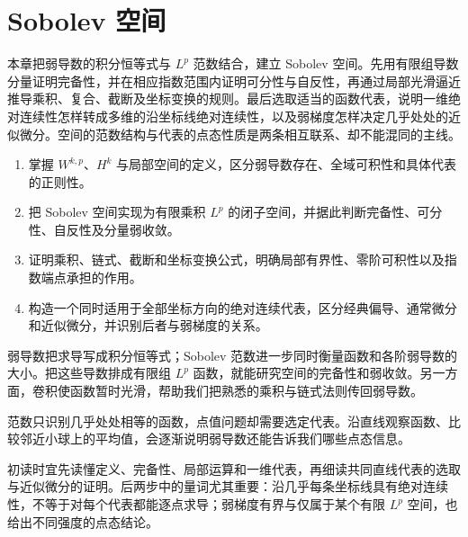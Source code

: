 \chapter{Sobolev 空间}
\label{b1:ch:21}
\begin{chapterabstract}
本章把弱导数的积分恒等式与 \(L^p\) 范数结合，建立 Sobolev 空间。先用有限组导数分量证明完备性，并在相应指数范围内证明可分性与自反性，再通过局部光滑逼近推导乘积、复合、截断及坐标变换的规则。最后选取适当的函数代表，说明一维绝对连续性怎样转成多维的沿坐标线绝对连续性，以及弱梯度怎样决定几乎处处的近似微分。空间的范数结构与代表的点态性质是两条相互联系、却不能混同的主线。
\end{chapterabstract}

\begin{learninggoals}
\begin{enumerate}
\item\label{b1:goal:21-definition}掌握 \(W^{k,p}\)、\(H^k\) 与局部空间的定义，区分弱导数存在、全域可积性和具体代表的正则性。
\item\label{b1:goal:21-structure}把 Sobolev 空间实现为有限乘积 \(L^p\) 的闭子空间，并据此判断完备性、可分性、自反性及分量弱收敛。
\item\label{b1:goal:21-calculus}证明乘积、链式、截断和坐标变换公式，明确局部有界性、零阶可积性以及指数端点承担的作用。
\item\label{b1:goal:21-representatives}构造一个同时适用于全部坐标方向的绝对连续代表，区分经典偏导、通常微分和近似微分，并识别后者与弱梯度的关系。
\end{enumerate}
\end{learninggoals}

弱导数把求导写成积分恒等式；Sobolev 范数进一步同时衡量函数和各阶弱导数的大小。把这些导数排成有限组 \(L^p\) 函数，就能研究空间的完备性和弱收敛。另一方面，卷积使函数暂时光滑，帮助我们把熟悉的乘积与链式法则传回弱导数。

\ProseParagraphBreak

范数只识别几乎处处相等的函数，点值问题却需要选定代表。沿直线观察函数、比较邻近小球上的平均值，会逐渐说明弱导数还能告诉我们哪些点态信息。

\ProseParagraphBreak

初读时宜先读懂定义、完备性、局部运算和一维代表，再细读共同直线代表的选取与近似微分的证明。后两步中的量词尤其重要：沿几乎每条坐标线具有绝对连续性，不等于对每个代表都能逐点求导；弱梯度有界与仅属于某个有限 \(L^p\) 空间，也给出不同强度的点态结论。

